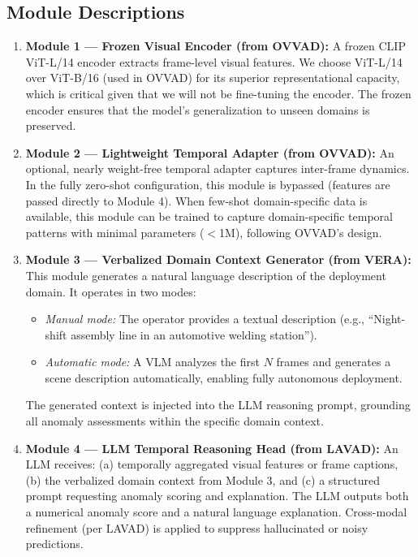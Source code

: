 \documentclass[12pt, a4paper]{article}
\begin{document}
\subsection{Module Descriptions}

\begin{enumerate}[leftmargin=*]
    \item \textbf{Module 1 --- Frozen Visual Encoder (from OVVAD):} 
    A frozen CLIP ViT-L/14 encoder extracts frame-level visual features. We choose ViT-L/14 over ViT-B/16 (used in OVVAD) for its superior representational capacity, which is critical given that we will not be fine-tuning the encoder. The frozen encoder ensures that the model's generalization to unseen domains is preserved.
    
    \item \textbf{Module 2 --- Lightweight Temporal Adapter (from OVVAD):} 
    An optional, nearly weight-free temporal adapter captures inter-frame dynamics. In the fully zero-shot configuration, this module is bypassed (features are passed directly to Module 4). When few-shot domain-specific data is available, this module can be trained to capture domain-specific temporal patterns with minimal parameters ($<$1M), following OVVAD's design.
    
    \item \textbf{Module 3 --- Verbalized Domain Context Generator (from VERA):} 
    This module generates a natural language description of the deployment domain. It operates in two modes:
    \begin{itemize}
        \item \textit{Manual mode:} The operator provides a textual description (e.g., ``Night-shift assembly line in an automotive welding station'').
        \item \textit{Automatic mode:} A VLM analyzes the first $N$ frames and generates a scene description automatically, enabling fully autonomous deployment.
    \end{itemize}
    The generated context is injected into the LLM reasoning prompt, grounding all anomaly assessments within the specific domain context.
    
    \item \textbf{Module 4 --- LLM Temporal Reasoning Head (from LAVAD):} 
    An LLM receives: (a) temporally aggregated visual features or frame captions, (b) the verbalized domain context from Module 3, and (c) a structured prompt requesting anomaly scoring and explanation. The LLM outputs both a numerical anomaly score and a natural language explanation. Cross-modal refinement (per LAVAD) is applied to suppress hallucinated or noisy predictions.
\end{enumerate}
\end{document}
